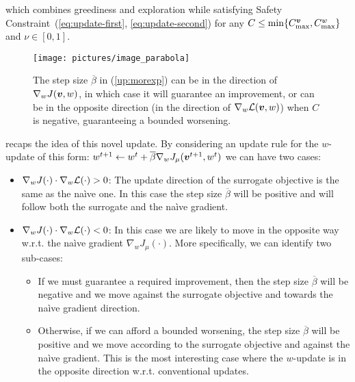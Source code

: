 which combines greediness and exploration while satisfying Safety Constraint~(\ref{eq:update-first}, \ref{eq:update-second}) for any ${C\leq\min\{C_{\text{max}}^{\vv},C_{\text{max}}^{w}\}}$ and $\nu\in[0,1]$. 

\begin{figure}
\texttt{[image: pictures/image\_parabola]}
\caption{The step size $\overline{\beta}$ in (\ref{up:morexp}) can be in the direction of $\gradJ[w]{\vv, w}$, in which case it will guarantee an improvement, or can be in the opposite direction (in the direction of $\gradDelta(\vv, w)$) when $C$ is negative, guaranteeing a bounded worsening. }
\label{fig:boobs}
\end{figure}

 recaps the idea of this novel update. By considering an update rule for the $w$-update of this form: $w^{t+1} \gets w^t + \overline{\beta} \nabla_w J_\mu(\vv^{t+1}, w^t)$ we can have two cases:
\begin{itemize}
\item $\nabla_w J(\cdot) \cdot \nabla_w \Deltav(\cdot) > 0$: The update direction of the surrogate objective is the same as the na\`ive one. In this case the step size $\overline{\beta}$ will be positive and will follow both the surrogate and the na\`ive gradient.
\item $\nabla_w J(\cdot) \cdot \nabla_w \Deltav(\cdot) < 0$: In this case we are likely to move in the opposite way w.r.t. the na\`ive gradient $\nabla_w J_\mu(\cdot)$. More specifically, we can identify two sub-cases:
\begin{itemize}
\item If we must guarantee a required improvement, then the step size $\overline{\beta}$ will be negative and we move against the surrogate objective and towards the na\`ive gradient direction.
\item Otherwise, if we can afford a bounded worsening, the step size $\overline{\beta}$ will be positive and we move according to the surrogate objective and against the na\`ive gradient. This is the most interesting case where the $w$-update is in the opposite direction w.r.t. conventional updates.
\end{itemize}
\end{itemize}

